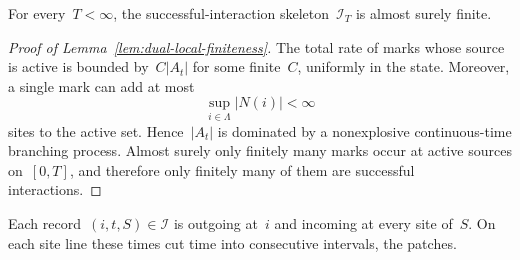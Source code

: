 \documentclass[EJP,preprint,NODS,nobera]{ejpecp}
\newcommand{\abs}[1]{\left|#1\right|}
\begin{document}
\begin{lemma}
\label{lem:dual-local-finiteness}
For every~$T<\infty$, the successful-interaction skeleton~$\mathcal I_T$ is
almost surely finite.
\end{lemma}

\begin{proof}[Proof of Lemma~\ref{lem:dual-local-finiteness}]
The total rate of marks whose source is active is bounded by~$C\abs{A_t}$ for some finite~$C$, uniformly in the state. Moreover, a single
mark can add at most
\begin{equation*}
\sup_{i\in\Lambda}\abs{N(i)}<\infty
\end{equation*}
sites to the active set. Hence~$\abs{A_t}$ is dominated by a nonexplosive
continuous-time branching process. Almost surely only finitely many marks occur
at active sources on~$[0,T]$, and therefore only finitely many of them are
successful interactions.
\end{proof}

Each record~$(i,t,S)\in\mathcal I$ is outgoing at~$i$ and incoming at every
site of~$S$. On each site line these times cut time into consecutive
intervals, the patches.
\end{document}
